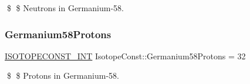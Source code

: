 \$ \$ Neutrons in Germanium-\/58. \mbox{\label{group___isotope_const-_germanium-_ge58_ga4b94380500aca4ce22c8de9ac4d42bac}} 
\subsubsection{\texorpdfstring{Germanium58\+Protons}{Germanium58Protons}}
{\footnotesize\ttfamily \mbox{\hyperlink{group___isotope_const-_macros_ga5f18360b3e99483a35c32d789e62621c}{I\+S\+O\+T\+O\+P\+E\+C\+O\+N\+S\+T\+\_\+\+I\+NT}} Isotope\+Const\+::\+Germanium58\+Protons = 32}

\$ \$ Protons in Germanium-\/58. 